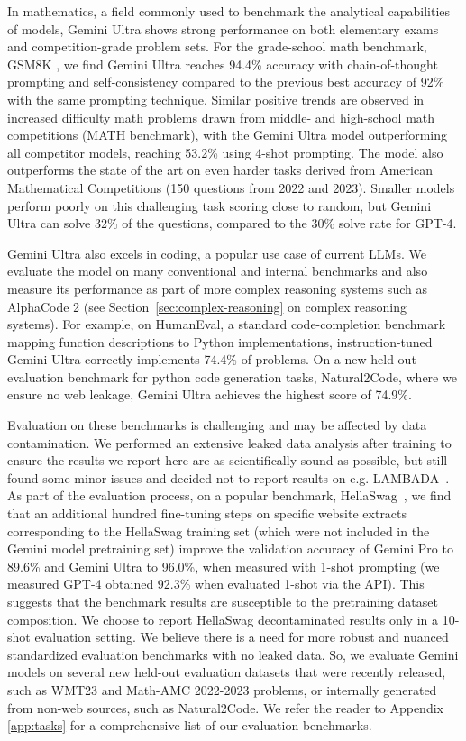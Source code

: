 In mathematics, a field commonly used to benchmark the analytical capabilities of models, Gemini Ultra shows strong performance on both elementary exams and competition-grade problem sets. For the grade-school math benchmark, GSM8K \cite{cobbe2021training}, we find Gemini Ultra reaches 94.4\% accuracy with chain-of-thought prompting and self-consistency \cite{selfconsistency} compared to the previous best accuracy of 92\% with the same prompting technique. Similar positive trends are observed in increased difficulty math problems drawn from middle- and high-school math competitions (MATH benchmark), with the Gemini Ultra model outperforming all competitor models, reaching 53.2\% using 4-shot prompting. The model also outperforms the state of the art on even harder tasks derived from American Mathematical Competitions (150 questions from 2022 and 2023). Smaller models perform poorly on this challenging task scoring close to random, but Gemini Ultra can solve 32\% of the questions, compared to the 30\% solve rate for GPT-4.

Gemini Ultra also excels in coding, a popular use case of current LLMs. We evaluate the model on many conventional and internal benchmarks and also measure its performance as part of more complex reasoning systems such as AlphaCode 2 (see Section~\ref{sec:complex-reasoning} on complex reasoning systems). For example, on HumanEval, a standard code-completion benchmark~\cite{chen2021evaluating} mapping function descriptions to Python implementations, instruction-tuned Gemini Ultra correctly implements 74.4\% of problems. On a new held-out evaluation benchmark for python code generation tasks, Natural2Code, where we ensure no web leakage, Gemini Ultra achieves the highest score of 74.9\%.


Evaluation on these benchmarks is challenging and may be affected by data contamination. We performed an extensive leaked data analysis after training to ensure the results we report here are as scientifically sound as possible, but still found some minor issues and decided not to report results on e.g. LAMBADA~\citep{paperno2016lambada}. As part of the evaluation process, on a popular benchmark, HellaSwag~\cite{zellers2019hellaswag}, we find that an additional hundred fine-tuning steps on specific website extracts corresponding to the HellaSwag training set (which were not included in the Gemini model pretraining set) improve the validation accuracy of Gemini Pro to 89.6\% and Gemini Ultra to 96.0\%, when measured with 1-shot prompting (we measured GPT-4 obtained 92.3\% when evaluated 1-shot via the API). This suggests that the benchmark results are susceptible to the pretraining dataset composition. We choose to report HellaSwag decontaminated results only in a 10-shot evaluation setting. We believe there is a need for more robust and nuanced standardized evaluation benchmarks with no leaked data. So, we evaluate Gemini models on several new held-out evaluation datasets that were recently released, such as WMT23 and Math-AMC 2022-2023 problems, or internally generated from non-web sources, such as Natural2Code. We refer the reader to Appendix \ref{app:tasks} for a comprehensive list of our evaluation benchmarks.

